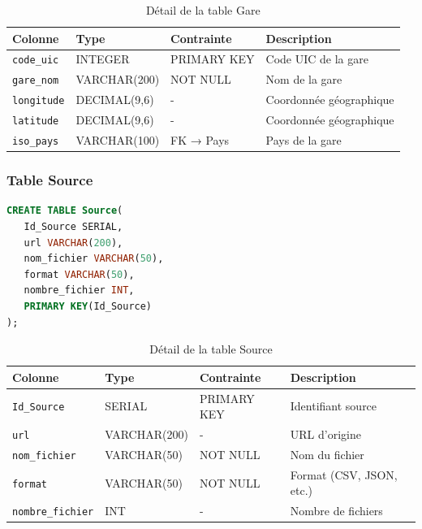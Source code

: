 \documentclass[12pt,a4paper]{article}
\begin{document}
\begin{table}[h!]
\centering
\begin{tabular}{|p{3.5cm}|p{2.5cm}|p{2.5cm}|p{4cm}|}
\hline
\textbf{Colonne} & \textbf{Type} & \textbf{Contrainte} & \textbf{Description} \\
\hline
\texttt{code\_uic} & INTEGER & PRIMARY KEY & Code UIC de la gare \\
\hline
\texttt{gare\_nom} & VARCHAR(200) & NOT NULL & Nom de la gare \\
\hline
\texttt{longitude} & DECIMAL(9,6) & - & Coordonnée géographique \\
\hline
\texttt{latitude} & DECIMAL(9,6) & - & Coordonnée géographique \\
\hline
\texttt{iso\_pays} & VARCHAR(100) & FK → Pays & Pays de la gare \\
\hline
\end{tabular}
\caption{Détail de la table Gare}
\end{table}

\subsubsection{Table Source}
\begin{lstlisting}[language=SQL, caption=Structure de la table Source]
CREATE TABLE Source(
   Id_Source SERIAL,
   url VARCHAR(200),
   nom_fichier VARCHAR(50),
   format VARCHAR(50),
   nombre_fichier INT,
   PRIMARY KEY(Id_Source)
);
\end{lstlisting}

\begin{table}[h!]
\centering
\begin{tabular}{|p{3.5cm}|p{2.5cm}|p{2.5cm}|p{4cm}|}
\hline
\textbf{Colonne} & \textbf{Type} & \textbf{Contrainte} & \textbf{Description} \\
\hline
\texttt{Id\_Source} & SERIAL & PRIMARY KEY & Identifiant source \\
\hline
\texttt{url} & VARCHAR(200) & - & URL d'origine \\
\hline
\texttt{nom\_fichier} & VARCHAR(50) & NOT NULL & Nom du fichier \\
\hline
\texttt{format} & VARCHAR(50) & NOT NULL & Format (CSV, JSON, etc.) \\
\hline
\texttt{nombre\_fichier} & INT & - & Nombre de fichiers \\
\hline
\end{tabular}
\caption{Détail de la table Source}
\end{table}
\end{document}
